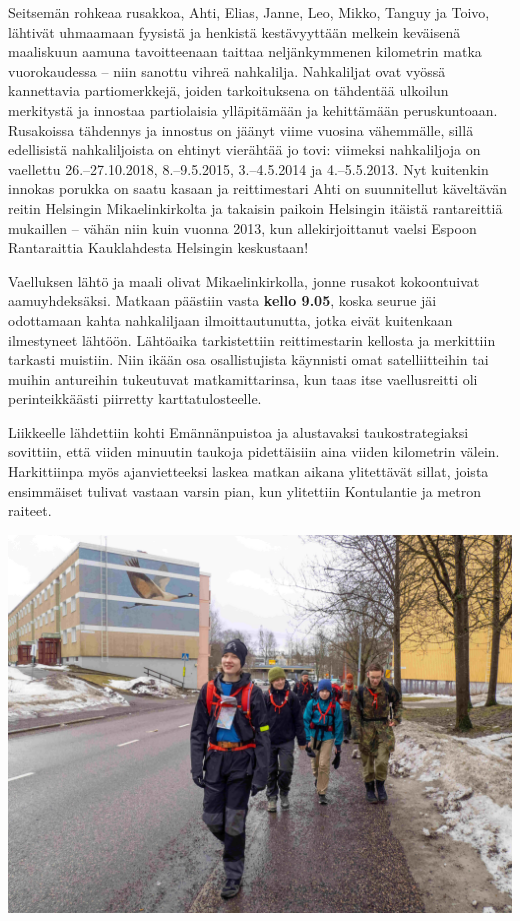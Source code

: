 \documentclass[10pt,finnish,a5paper,headings=small,twoside=semi]{scrartcl}
\begin{document}
\begin{multicols}{2}

	Seitsemän rohkeaa rusakkoa, \mbox{Ahti}, Elias, Janne, Leo, Mikko,
	\mbox{Tanguy} ja Toivo, lähtivät uhmaamaan fyysistä ja henkistä kestävyyttään
	melkein keväisenä maaliskuun aamuna tavoitteenaan taittaa
	neljänkymmenen kilometrin matka vuorokaudessa – niin sanottu vihreä
	nahkalilja. Nahkaliljat ovat vyössä kannettavia partiomerkkejä, joiden
	tarkoituksena on tähdentää ulkoilun merkitystä ja innostaa partiolaisia
	ylläpitämään ja kehittämään peruskuntoaan. Rusakoissa tähdennys ja
	innostus on jäänyt viime vuosina vähemmälle, sillä edellisistä
	nahkaliljoista on ehtinyt vierähtää jo tovi: viimeksi nahkaliljoja on
	vaellettu 26.–27.10.2018, 8.–9.5.2015, 3.–4.5.2014 ja 4.–5.5.2013. Nyt
	kuitenkin innokas porukka on saatu kasaan ja reittimestari Ahti on
	suunnitellut käveltävän reitin Helsingin Mikaelinkirkolta ja takaisin
	paikoin Helsingin itäistä rantareittiä mukaillen – vähän niin kuin
	vuonna 2013, kun allekirjoittanut vaelsi Espoon Rantaraittia
	Kauklahdesta Helsingin keskustaan!

	Vaelluksen lähtö ja maali olivat Mikaelinkirkolla, jonne rusakot
	kokoontuivat aamuyhdeksäksi. Matkaan päästiin vasta \textbf{kello
	9.05}, koska seurue jäi odottamaan kahta nahkaliljaan ilmoittautunutta,
	jotka eivät kuitenkaan ilmestyneet lähtöön. Lähtöaika tarkistettiin
	reittimestarin kellosta ja merkittiin tarkasti muistiin. Niin ikään osa
	osallistujista käynnisti omat satelliitteihin tai muihin antureihin
	tukeutuvat matkamittarinsa, kun taas itse vaellusreitti oli
	perinteikkäästi piirretty karttatulosteelle.

	Liikkeelle lähdettiin kohti Emännänpuistoa ja alustavaksi
	taukostrategiaksi sovittiin, että viiden minuutin taukoja pidettäisiin
	aina viiden kilometrin välein. Harkittiinpa myös ajanvietteeksi laskea
	matkan aikana ylitettävät sillat, joista ensimmäiset tulivat vastaan
	varsin pian, kun ylitettiin Kontulantie ja metron raiteet.

	\vspace*{0.32cm}
	\noindent\includegraphics[width=\linewidth]{assets/nahkaliljavantaa}


\end{multicols}
\end{document}
